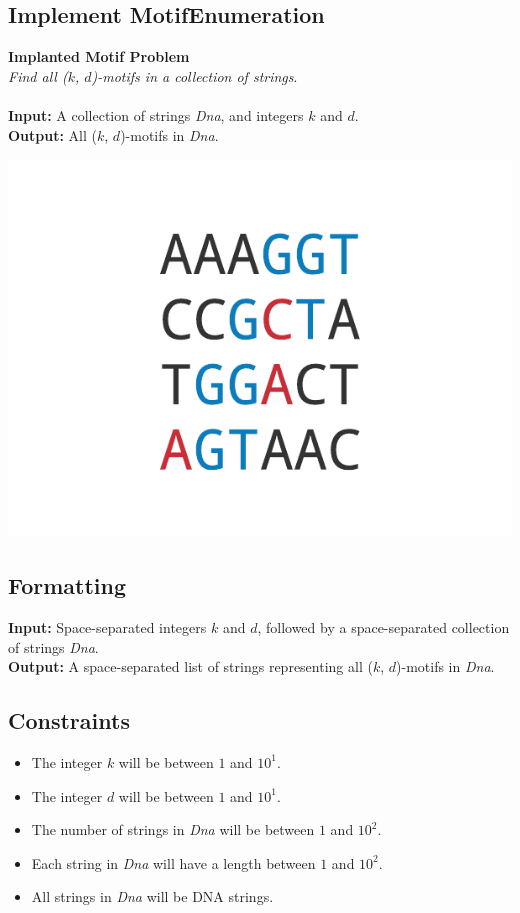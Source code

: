 \documentclass{article}
\begin{document}
\subsection{Implement MotifEnumeration}
\hline\vspace{5}
\noindent\textbf{Implanted Motif Problem}\\
\emph{Find all ($k$, $d$)-motifs in a collection of strings}.\\ \\
\textbf{Input:} A collection of strings \emph{Dna}, and integers $k$ and $d$.\\
\textbf{Output:} All ($k$, $d$)-motifs in \emph{Dna}.
\begin{center}
    \includegraphics[scale=0.24]{c2/logos/2A.png} 
\end{center}
\hline\vspace{5}

\subsection*{Formatting}
\textbf{Input:} Space-separated integers $k$ and $d$, followed by a space-separated collection of strings \emph{Dna}.\\
\noindent\textbf{Output:} A space-separated list of strings representing all ($k$, $d$)-motifs in \emph{Dna}.

\subsection*{Constraints}
\begin{itemize}
    \item The integer $k$ will be between $1$ and $10^1$.
    \item The integer $d$ will be between $1$ and $10^1$.
    \item The number of strings in \emph{Dna} will be between $1$ and $10^2$.
    \item Each string in \emph{Dna} will have a length between $1$ and $10^2$.
    \item All strings in \emph{Dna} will be DNA strings.
\end{itemize}
\pagebreak
\end{document}
